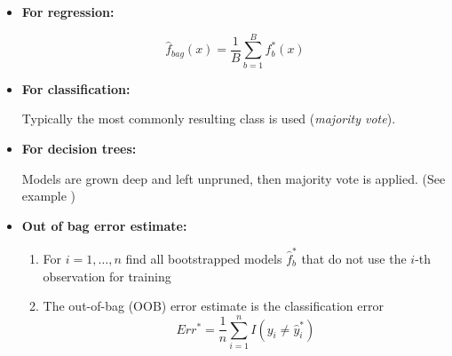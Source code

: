 	\begin{itemize}
	    \item \textbf{For regression:}

	    	$$ \hat{f}_{bag}(x) = \frac{1}{B} \sum\limits_{b=1}^B f_b^*(x)$$

	  	\item \textbf{For classification:}

			Typically the most commonly resulting class is used (\emph{majority vote}).

	  	\item \textbf{For decision trees:}

    		Models are grown deep and left unpruned, then majority vote is applied. (See example \textrightarrow)

    	\item \textbf{Out of bag error estimate:}

	 	    \begin{enumerate}
	 	        \item For $i = 1,\dots, n$ find all bootstrapped models $\hat{f}_b^*$ that do not use the $i$-th observation for training
	 	        \item The out-of-bag (OOB) error estimate is the classification error
	 	        	$$Err^* = \frac{1}{n} \sum\limits_{i=1}^nI(y_i \neq \hat{y}_i^*)$$
	 	    \end{enumerate}
	\end{itemize}
%  		
%  		    
%  		    	
%  		  	
%  		  	
%  		  	
%  	    		
%  	    	
%  		
    	
